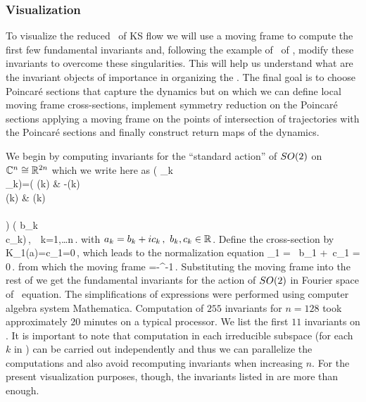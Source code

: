 \subsubsection{Visualization}
\label{sec:KSeMF}

To visualize the reduced \statesp\ of KS flow we will use a moving frame
to compute the first few fundamental invariants and, following the example of \CLe\ of ,
modify these invariants to overcome these singularities. This will help us understand what
are the invariant objects of importance in organizing the \statesp. The final goal is to choose
Poincar\'e sections that capture the dynamics but on which we can define local moving frame cross-sections, implement symmetry reduction on the Poincar\'e sections applying a moving frame on
the points of intersection of trajectories with the Poincar\'e sections and finally construct
return maps of the dynamics.

We begin by computing invariants for the ``standard action''  of $SO(2)$ on $\mathbb{C}^{n}\cong\mathbb{R}^{2n}$ which we write here as
\beq
	\left( _k \\ _k\earr \right)=\left(
			    			\cos(k\theta) & -\sin(k\theta)\\
						\sin(k\theta) & \cos(k\theta)\\
			   			\earr\\	
						\right) \left( b_k \\ c_k\earr\right)\,,\ \ k=1,\ldots n\,.
	\label{eq:SO2stand}
\eeq
with $a_k=b_k+i c_k\,,\ b_k,c_k\in\mathbb{R}^{}$.  Define the cross-section by
\beq
 	K_1(a)=c_1=0\,,
\eeq
which leads to the normalization equation
\beq
	_1 = \sin\theta\, b_1 +\sin\theta\, c_1 = 0\,.
	\label{eq:SO2norm}
\eeq
from which the moving frame
\beq
	\theta=-\tan^{-1}\,.
	\label{eq:SO2stand}
\eeq
Substituting the moving frame into the rest of  we get the fundamental invariants for the action
of $SO(2)$ in Fourier space of \KS\ equation. The simplifications of expressions were performed using computer algebra system Mathematica. Computation of $255$ invariants for $n=128$ took approximately $20$ minutes on a typical processor.
We list the first $11$ invariants on . It is important to note that computation in each irreducible
subspace (for each $k$ in ) can be carried out independently and thus we can parallelize the computations
and also avoid recomputing invariants when increasing $n$. For the present visualization purposes, though, the  invariants
listed in  are more than enough.

